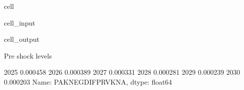 \documentclass[letterpaper,10pt,english]{jupyterBook}
\begin{document}
\begin{sphinxuseclass}{cell}\begin{sphinxVerbatimInput}

\begin{sphinxuseclass}{cell_input}
\begin{sphinxVerbatim}[commandchars=\\\{\}]

\PYG{p}{[}\PYG{p}{]}\PYG{p}{[}\PYG{p}{]}


\PYG{p}{[}\PYG{p}{]}
\end{sphinxVerbatim}

\end{sphinxuseclass}\end{sphinxVerbatimInput}
\begin{sphinxVerbatimOutput}

\begin{sphinxuseclass}{cell_output}
\begin{sphinxVerbatim}[commandchars=\\\{\}]
Pre shock levels
\end{sphinxVerbatim}

\begin{sphinxVerbatim}[commandchars=\\\{\}]
2025   \PYGZhy{}0.000458
2026   \PYGZhy{}0.000389
2027   \PYGZhy{}0.000331
2028   \PYGZhy{}0.000281
2029   \PYGZhy{}0.000239
2030   \PYGZhy{}0.000203
Name: PAKNEGDIFPRVKN\PYGZus{}A, dtype: float64
\end{sphinxVerbatim}

\end{sphinxuseclass}\end{sphinxVerbatimOutput}

\end{sphinxuseclass}
\end{document}
